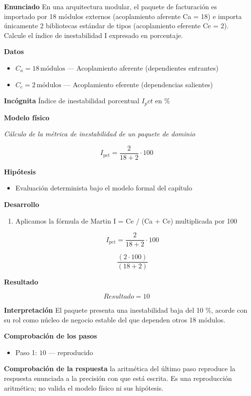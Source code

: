 \documentclass{book}
\begin{document}
\begin{tcolorbox}[title={Problema resuelto}, studiumworked, breakable]

\noindent\textbf{Enunciado}
En una arquitectura modular, el paquete de facturación es importado por 18 módulos externos (acoplamiento aferente Ca = 18) e importa únicamente 2 bibliotecas estándar de tipos (acoplamiento eferente Ce = 2). Calcule el índice de inestabilidad I expresado en porcentaje.

\noindent\textbf{Datos}
\begin{itemize}
\item $C_{a} = 18\,\mathrm{módulos}$ — Acoplamiento aferente (dependientes entrantes)
\item $C_{e} = 2\,\mathrm{módulos}$ — Acoplamiento eferente (dependencias salientes)
\end{itemize}

\noindent\textbf{Incógnita}
Índice de inestabilidad porcentual \(I_pct\) en \%

\noindent\textbf{Modelo físico}

\noindent\textit{Cálculo de la métrica de inestabilidad de un paquete de dominio}

\[
I_{\text{pct}} = \frac{2}{18 + 2} \cdot 100
\]

\noindent\textbf{Hipótesis}
\begin{itemize}
\item Evaluación determinista bajo el modelo formal del capítulo
\end{itemize}

\noindent\textbf{Desarrollo}
\begin{enumerate}
\item
Aplicamos la fórmula de Martin I = Ce / (Ca + Ce) multiplicada por 100

\[
I_{\text{pct}} = \frac{2}{18 + 2} \cdot 100
\]

\[
\frac{\left(2\cdot 100\right)}{\left(18+2\right)}
\]
\end{enumerate}

\noindent\textbf{Resultado}

\[
Resultado = 10
\]

\noindent\textbf{Interpretación}
El paquete presenta una inestabilidad baja del 10 \%, acorde con su rol como núcleo de negocio estable del que dependen otros 18 módulos.

\noindent\textbf{Comprobación de los pasos}
\begin{itemize}
\item Paso 1: $10$ — reproducido
\end{itemize}

\noindent\textbf{Comprobación de la respuesta} la aritmética del último paso reproduce la respuesta enunciada a la precisión con que está escrita. Es una reproducción aritmética; no valida el modelo físico ni sus hipótesis.
\end{tcolorbox}
\end{document}
